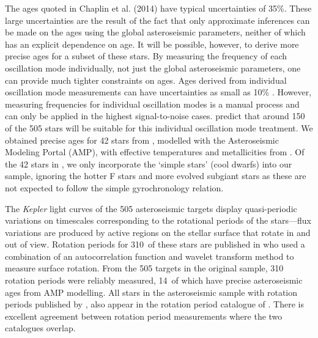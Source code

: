 \documentclass[11pt,preprint]{aastex}
\newcommand{\nastero}{310}
\newcommand{\nprecise}{14~}
\newcommand{\ngarcia}{310~}
\begin{document}
The ages quoted in Chaplin et al. (2014) have typical uncertainties of 35\%.
These large uncertainties are the result of the fact that only approximate
inferences can be made on the ages using the global asteroseismic parameters,
neither of which has an explicit dependence on age.
It will be possible, however, to derive more precise ages for a subset of
these stars.
By measuring the frequency of each oscillation mode individually,
not just the global asteroseismic parameters, one can provide much tighter
constraints on ages.
Ages derived from individual oscillation mode measurements can have
uncertainties as small as 10\% \citep{Brown1994, SilvaAguirre2013}.
However, measuring frequencies for individual oscillation modes is a manual
process and can only be applied in the highest signal-to-noise cases.
\citet{Chaplin2014} predict that around 150 of the 505 stars will be suitable
for this individual oscillation mode treatment.
We obtained precise ages for 42 stars from \citet{Metcalfe2014}, modelled with
the Asteroseismic Modeling Portal (AMP), with effective temperatures and
metallicities from \citet{Bruntt2012}.
Of the 42 stars in \citet{Metcalfe2014}, we only incorporate the `simple
stars' (cool dwarfs) into our sample, ignoring the hotter F stars and more
evolved subgiant stars as these are not expected to follow the simple
gyrochronology relation.

The {\it Kepler} light curves of the 505 asteroseismic targets display
quasi-periodic variations on timescales corresponding to the rotational
periods of the stars---flux variations are produced by active regions on the
stellar surface that rotate in and out of view.
Rotation periods for \ngarcia of these stars are published in
\citet{Garcia2014} who used a combination of an autocorrelation function and
wavelet transform method to measure surface rotation.
From the 505 targets in the original sample, \nastero$~$rotation periods were
reliably measured, \nprecise of which have precise asteroseismic ages from AMP
modelling.
All stars in the asteroseismic sample with rotation periods published by
\citet{McQuillan_2014}, also appear in the rotation period catalogue of
\citet{Garcia2014}.
There is excellent agreement between rotation period
measurements where the two catalogues overlap.
\end{document}
